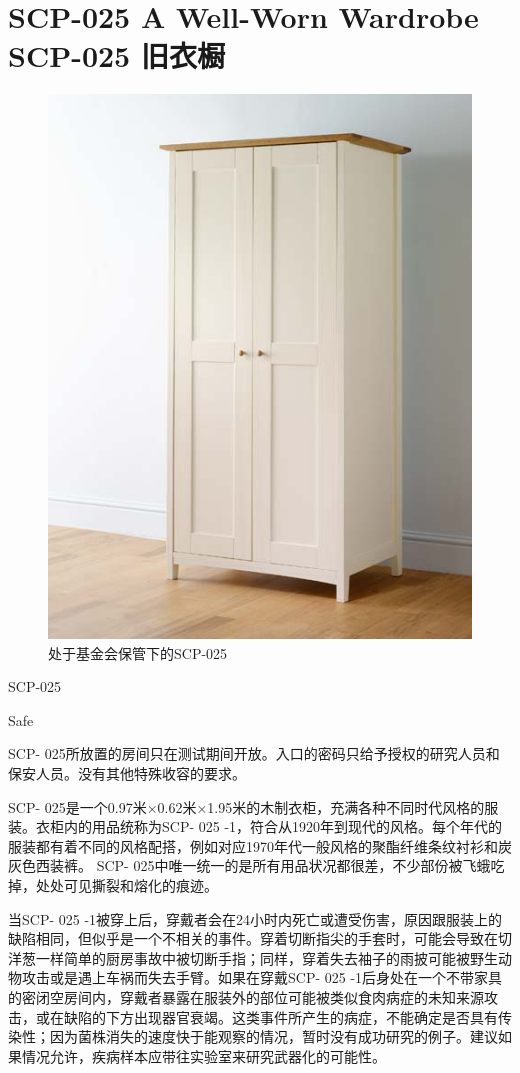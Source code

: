 \chapter[SCP-025 旧衣橱]{
    SCP-025 A Well-Worn Wardrobe\\
    SCP-025 旧衣橱
}

\label{chap:SCP-025}

\begin{figure}[H]
    \centering
    \includegraphics[width=0.5\linewidth]{images/SCP.025.jpg}
    \caption*{处于基金会保管下的SCP-025}
\end{figure}

SCP-025

Safe

SCP- 025所放置的房间只在测试期间开放。入口的密码只给予授权的研究人员和保安人员。没有其他特殊收容的要求。

SCP- 025是一个0.97米×0.62米×1.95米的木制衣柜，充满各种不同时代风格的服装。衣柜内的用品统称为SCP- 025 -1，符合从1920年到现代的风格。每个年代的服装都有着不同的风格配搭，例如对应1970年代一般风格的聚酯纤维条纹衬衫和炭灰色西装裤。 SCP- 025中唯一统一的是所有用品状况都很差，不少部份被飞蛾吃掉，处处可见撕裂和熔化的痕迹。

当SCP- 025 -1被穿上后，穿戴者会在24小时内死亡或遭受伤害，原因跟服装上的缺陷相同，但似乎是一个不相关的事件。穿着切断指尖的手套时，可能会导致在切洋葱一样简单的厨房事故中被切断手指；同样，穿着失去袖子的雨披可能被野生动物攻击或是遇上车祸而失去手臂。如果在穿戴SCP- 025 -1后身处在一个不带家具的密闭空房间内，穿戴者暴露在服装外的部位可能被类似食肉病症的未知来源攻击，或在缺陷的下方出现器官衰竭。这类事件所产生的病症，不能确定是否具有传染性；因为菌株消失的速度快于能观察的情况，暂时没有成功研究的例子。建议如果情况允许，疾病样本应带往实验室来研究武器化的可能性。

